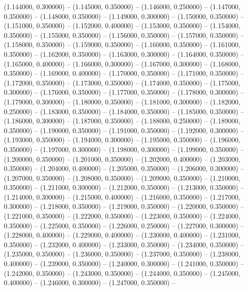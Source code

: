 (1.144000, 0.300000) -- 
(1.145000, 0.350000) -- 
(1.146000, 0.250000) -- 
(1.147000, 0.350000) -- 
(1.148000, 0.350000) -- 
(1.149000, 0.300000) -- 
(1.150000, 0.350000) -- 
(1.151000, 0.350000) -- 
(1.152000, 0.400000) -- 
(1.153000, 0.350000) -- 
(1.154000, 0.350000) -- 
(1.155000, 0.350000) -- 
(1.156000, 0.350000) -- 
(1.157000, 0.350000) -- 
(1.158000, 0.350000) -- 
(1.159000, 0.350000) -- 
(1.160000, 0.350000) -- 
(1.161000, 0.350000) -- 
(1.162000, 0.350000) -- 
(1.163000, 0.300000) -- 
(1.164000, 0.350000) -- 
(1.165000, 0.400000) -- 
(1.166000, 0.300000) -- 
(1.167000, 0.300000) -- 
(1.168000, 0.350000) -- 
(1.169000, 0.400000) -- 
(1.170000, 0.350000) -- 
(1.171000, 0.350000) -- 
(1.172000, 0.350000) -- 
(1.173000, 0.350000) -- 
(1.174000, 0.350000) -- 
(1.175000, 0.300000) -- 
(1.176000, 0.350000) -- 
(1.177000, 0.350000) -- 
(1.178000, 0.300000) -- 
(1.179000, 0.300000) -- 
(1.180000, 0.350000) -- 
(1.181000, 0.300000) -- 
(1.182000, 0.250000) -- 
(1.183000, 0.350000) -- 
(1.184000, 0.350000) -- 
(1.185000, 0.350000) -- 
(1.186000, 0.300000) -- 
(1.187000, 0.350000) -- 
(1.188000, 0.250000) -- 
(1.189000, 0.350000) -- 
(1.190000, 0.350000) -- 
(1.191000, 0.350000) -- 
(1.192000, 0.300000) -- 
(1.193000, 0.350000) -- 
(1.194000, 0.300000) -- 
(1.195000, 0.350000) -- 
(1.196000, 0.350000) -- 
(1.197000, 0.300000) -- 
(1.198000, 0.300000) -- 
(1.199000, 0.350000) -- 
(1.200000, 0.350000) -- 
(1.201000, 0.350000) -- 
(1.202000, 0.400000) -- 
(1.203000, 0.350000) -- 
(1.204000, 0.400000) -- 
(1.205000, 0.350000) -- 
(1.206000, 0.300000) -- 
(1.207000, 0.350000) -- 
(1.208000, 0.350000) -- 
(1.209000, 0.350000) -- 
(1.210000, 0.350000) -- 
(1.211000, 0.300000) -- 
(1.212000, 0.350000) -- 
(1.213000, 0.350000) -- 
(1.214000, 0.300000) -- 
(1.215000, 0.400000) -- 
(1.216000, 0.350000) -- 
(1.217000, 0.300000) -- 
(1.218000, 0.350000) -- 
(1.219000, 0.350000) -- 
(1.220000, 0.350000) -- 
(1.221000, 0.350000) -- 
(1.222000, 0.350000) -- 
(1.223000, 0.350000) -- 
(1.224000, 0.350000) -- 
(1.225000, 0.350000) -- 
(1.226000, 0.250000) -- 
(1.227000, 0.300000) -- 
(1.228000, 0.400000) -- 
(1.229000, 0.400000) -- 
(1.230000, 0.400000) -- 
(1.231000, 0.350000) -- 
(1.232000, 0.400000) -- 
(1.233000, 0.350000) -- 
(1.234000, 0.350000) -- 
(1.235000, 0.350000) -- 
(1.236000, 0.350000) -- 
(1.237000, 0.350000) -- 
(1.238000, 0.400000) -- 
(1.239000, 0.350000) -- 
(1.240000, 0.300000) -- 
(1.241000, 0.350000) -- 
(1.242000, 0.350000) -- 
(1.243000, 0.350000) -- 
(1.244000, 0.350000) -- 
(1.245000, 0.400000) -- 
(1.246000, 0.300000) -- 
(1.247000, 0.350000) -- 

